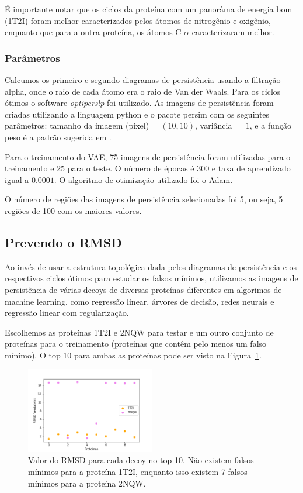 É importante notar que os ciclos da proteína com um panorâma de energia bom (1T2I) foram melhor caracterizados
pelos átomos de nitrogênio e oxigênio, enquanto que para a outra proteína, os átomos C-$\alpha$ caracterizaram melhor.

\subsubsection{Parâmetros}

Calcumos os primeiro e segundo diagramas de persistência usando a filtração alpha, onde o raio de cada átomo
era o raio de Van der Waals. Para os ciclos ótimos o software \textit{optiperslp} foi utilizado. As imagens
de persistência foram criadas utilizando a linguagem python e o pacote persim \cite{scikittda2019} com
os seguintes parâmetros: tamanho da imagem (pixel) = $(10,10)$, variância $=1$, e a função peso é a padrão
sugerida em \cite{Adams2017}.

Para o treinamento do VAE, 75 imagens de persistência foram utilizadas para o treinamento e 25 para o teste. O
número de épocas é 300 e taxa de aprendizado igual a $0.0001$. O algoritmo de otimização utilizado foi o Adam.

O número de regiões das imagens de persistência selecionadas foi 5, ou seja, 5 regiões de 100 com
os maiores valores.

\subsection{Prevendo o RMSD}

Ao invés de usar a estrutura topológica dada pelos diagramas de persistência e os respectivos ciclos ótimos para
estudar os falsos mínimos, utilizamos as imagens de persistência de várias decoys de diversas proteínas diferentes
em algorimos de machine learning, como regressão linear, árvores de decisão, redes neurais e regressão linear
com regularização.

Escolhemos as proteínas 1T2I e 2NQW para testar e um outro conjunto de proteínas para o treinamento (proteínas
que contêm pelo menos um falso mínimo). O top 10 para ambas as proteínas pode ser visto na Figura~\ref{fig:truermsd}.

\begin{figure}[!htbp]
    \centering
    \includegraphics[width=0.5\textwidth]{beamer/images/true_rmsd.png}
    \caption{Valor do RMSD para cada decoy no top 10. Não existem falsos mínimos para a proteína 1T2I, enquanto
    isso existem 7 falsos mínimos para a proteína 2NQW.}
    \label{fig:truermsd}
    \fautor
\end{figure}

